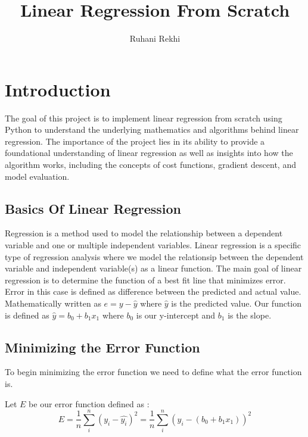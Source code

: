 \documentclass{article}
\title{Linear Regression From Scratch}
\author{Ruhani Rekhi}
\date{}
\begin{document}
\maketitle


\section{Introduction}

The goal of this project is to implement linear regression from scratch using Python to understand the underlying mathematics and algorithms behind linear regression.
The importance of the project lies in its ability to provide a foundational understanding of linear regression as well as insights into how the algorithm works, including the concepts of cost functions, gradient descent, and model evaluation.


\subsection{Basics Of Linear Regression}
Regression is a method used to model the relationship between a dependent variable and one or multiple independent variables. Linear regression is a specific type of regression analysis where we model the relationsip between the dependent variable and independent variable(s) as a linear function.
The main goal of linear regression is to determine the function of a best fit line that minimizes error. Error in this case is defined as difference between the predicted and actual value. Mathematically written as $ e = y - \hat{y}  $ where $\hat{y}$ is the predicted value. Our function is defined as $ \hat{y} = b_0 + b_1x_1 $ where $b_0$ is our y-intercept and $b_1$ is the slope. 

\subsection{Minimizing the Error Function}

To begin minimizing the error function we need to define what the error function is. 

Let $E$ be our error function defined as :
\[E = \frac{1}{n} \sum_{i}^{n}(y_i - \hat{y_i})^2
    = \frac{1}{n} \sum_{i}^{n}(y_i - (b_0 + b_1x_1))^2
\]
\end{document}
